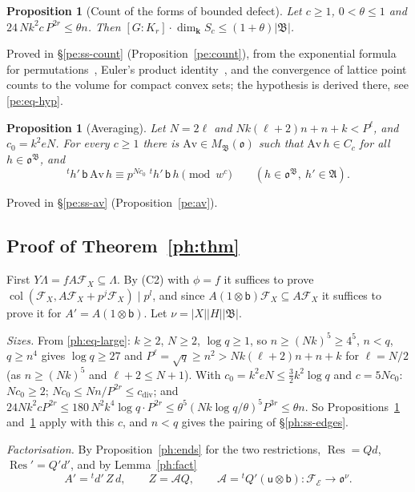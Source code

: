 \documentclass[10pt]{amsart}
\newtheorem{proposition}[theorem]{Proposition}
\theoremstyle{definition}
\theoremstyle{remark}
\providecommand{\aucol}{\operatorname{col}}
\providecommand{\pao}{\mathfrak o}
\providecommand{\phA}{\mathfrak A}
\providecommand{\phB}{\mathfrak B}
\providecommand{\phcd}{c_{\mathrm{div}}}
\providecommand{\phk}{\boldsymbol k}
\begin{document}
\begin{proposition}[Count of the forms of bounded defect]\label{ph:count}
Let $c\ge1$, $0<\theta\le1$ and $24\,Nk^2c\,P^{2r}\le\theta n$. Then
$[G:K_r]\cdot\dim_{\phk} S_c\le(1+\theta)|\phB|$.
\end{proposition}
\noindent Proved in \S\ref{pe:ss-count} (Proposition~\ref{pe:count}), from the exponential formula
for permutations~\cite[Cor.~5.1.9]{StanleyEC2}, Euler's product identity~\cite{AndrewsPartitions}, \cite[Ch.~I, \S2, Example~4]{Macdonald}
and the convergence of lattice point counts to the volume for compact convex sets; the hypothesis
is derived there, see \eqref{pe:eq-hyp}.

\begin{proposition}[Averaging]\label{ph:av}
Let $N=2\ell$ and $Nk(\ell+2)n+n+k<P^\ell$, and $c_0=k^2eN$. For every $c\ge1$ there is
$\mathrm{Av}\in M_\phB(\pao)$ such that $\mathrm{Av}\,h\in C_c$ for all $h\in\pao^\phB$, and
\[
{}^th'\,\mathsf b\,\mathrm{Av}\,h\equiv p^{Nc_0}\;{}^th'\,\mathsf b\,h\pmod{w^c}\qquad(h\in
\pao^\phB,\ h'\in\phA).
\]
\end{proposition}
\noindent Proved in \S\ref{pe:ss-av} (Proposition~\ref{pe:av}).

\subsection{Proof of Theorem~\ref{ph:thm}}\label{ph:ss-proof}
First $Y\Lambda=fA\mathcal F_X\subseteq\Lambda$. By (C2) with $\phi=f$ it suffices to prove
$\aucol(\mathcal F_X,A\mathcal F_X+p^j\mathcal F_X)\mid p^l$, and since
$A(1\otimes\mathsf b)\mathcal F_X\subseteq A\mathcal F_X$ it suffices to prove it for
$A'=A(1\otimes\mathsf b)$. Let $\nu=|X||H||\phB|$.

\emph{Sizes.} From \eqref{ph:eq-large}: $k\ge2$, $N\ge2$, $\log q\ge1$, so $n\ge(Nk)^5\ge4^5$,
$n<q$, $q\ge n^4$ gives $\log q\ge27$ and $P^{\ell}=\sqrt q\ge n^2>Nk(\ell+2)n+n+k$ for $\ell=N/2$
(as $n\ge(Nk)^5$ and $\ell+2\le N+1$). With $c_0=k^2eN\le\tfrac32k^2\log q$ and $c=5Nc_0$: $Nc_0
\ge2$; $Nc_0\le Nn/P^{2r}\le\phcd$; and $24Nk^2cP^{2r}\le180\,N^2k^4\log q\cdot P^{2r}\le\theta^5(Nk\log q/\theta)^5P^{3r}
\le\theta n$. So
Propositions~\ref{ph:count} and~\ref{ph:av} apply with this $c$, and $n<q$ gives the pairing of
\S\ref{ph:ss-edges}.

\emph{Factorisation.} By Proposition~\ref{ph:ends} for the two restrictions,
$\operatorname{Res}=Qd$, $\operatorname{Res}'=Q'd'$, and by Lemma~\ref{ph:fact}
\[
A'={}^td'\,Z\,d,\qquad Z=\mathcal AQ,\qquad\mathcal A={}^tQ'(\mathsf u\otimes\mathsf b)\colon
\mathcal F_{\mathcal E}\to\pao^\nu .
\]
\end{document}
